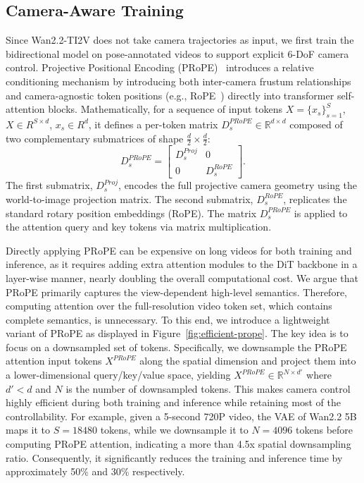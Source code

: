 \subsection{Camera-Aware Training}
Since Wan2.2-TI2V does not take camera trajectories as input, we first train
the bidirectional model on pose-annotated videos to support explicit 6-DoF
camera control.
% 
Projective Positional Encoding (PRoPE)~\citep{li2025cameras} introduces a relative conditioning mechanism by introducing both inter-camera frustum relationships and camera-agnostic token positions (e.g., RoPE~\citep{su2024roformer}) directly into transformer self-attention blocks.
Mathematically, for a sequence of input tokens $X=\{x_s\}_{s=1}^{S}$, $X\in R^{S\times d}$, $x_s\in R^{d}$, it defines a per-token matrix $D_s^{PRoPE} \in \mathbb{R}^{d \times d}$  composed of two complementary submatrices of shape $\frac{d}{2} \times \frac{d}{2}$:
$$D_s^{PRoPE} = \begin{bmatrix} D_s^{Proj} & 0 \\ 0 & D_s^{RoPE} \end{bmatrix}.$$
The first submatrix, $D_s^{Proj}$, encodes the full projective camera geometry using the world-to-image projection matrix.
The second submatrix, $D_s^{RoPE}$, replicates the standard rotary position embeddings (RoPE). The matrix $D_s^{PRoPE}$ is applied to the attention query and key tokens via matrix multiplication.

Directly applying PRoPE can be expensive on long videos for both training and inference, as it requires adding extra attention modules to the DiT backbone in a layer-wise manner, nearly doubling the overall computational cost.
We argue that PRoPE primarily captures the view-dependent high-level semantics.
Therefore, computing attention over the full-resolution video token set, which contains complete semantics, is unnecessary.
To this end, we introduce a lightweight variant of PRoPE as displayed in Figure~\ref{fig:efficient-prope}. The key idea is to focus on a downsampled set of tokens. Specifically, we downsample the PRoPE attention input tokens $X^{PRoPE}$ along the spatial dimension and project them into a lower-dimensional query/key/value space, yielding
$X^{PRoPE} \in \mathbb{R}^{N \times d'}$ where $d' < d$ and $N$ is the number of downsampled tokens.  This makes camera control highly efficient during both training and inference  while retaining most of the controllability. For example, given a 5-second 720P video, the VAE of Wan2.2 5B maps it to $S=18480$ tokens, while we downsample it to $N=4096$ tokens before computing PRoPE attention, indicating a more than 4.5x spatial downsampling ratio. Consequently, it significantly reduces the training and inference time by approximately 50\% and 30\% respectively.

